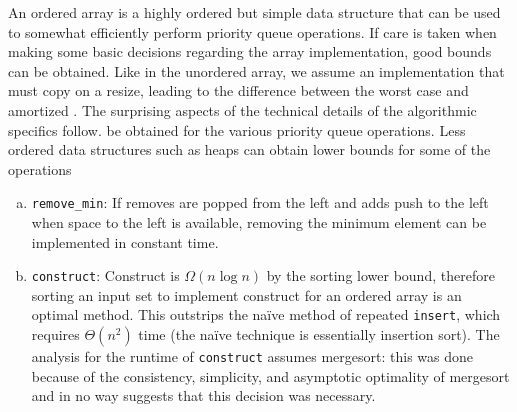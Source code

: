 
An ordered array is a highly ordered but simple data structure that can be used to somewhat efficiently perform priority queue operations.  If care is taken when making some basic decisions regarding the array implementation, good bounds can be obtained.  Like in the unordered array, we assume an implementation that must copy on a resize, leading to the difference between the worst case and amortized .  The surprising aspects of the technical details of the algorithmic specifics follow.
 be obtained for the various priority queue operations.  Less ordered data structures such as heaps can obtain lower bounds for some of the operations
\begin{enumerate}[a):]

\item \texttt{remove\_min}: If removes are popped from the left and adds push to the left when space to the left is available, removing the minimum element can be implemented in constant time.

\item \texttt{construct}: Construct is $\Omega(n \log n)$ by the sorting lower bound, therefore sorting an input set to implement construct for an ordered array is an optimal method.  This outstrips the naïve method of repeated \texttt{insert}, which requires $\Theta(n ^ 2)$ time (the naïve technique is essentially insertion sort).  The analysis for the runtime of \texttt{construct} assumes mergesort: this was done because of the consistency, simplicity, and asymptotic optimality of mergesort and in no way suggests that this decision was necessary.

\end{enumerate}

